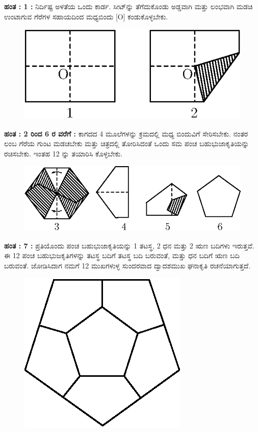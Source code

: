 \begin{enumerate}
 \noindent
 {\bf ಹಂತ : 1 :} ನಿರ್ದಿಷ್ಟ ಅಳತೆಯ ಒಂದು ಕಾರ್ಡ. ಸೀಟ್‌ನ್ನು ತೆಗೆದುಕೊಂಡು ಅಡ್ಡವಾಗಿ ಮತ್ತು ಲಂಭವಾಗಿ ಮಡಚಿ ಉಂಟಾಗುವ ಗೆರೆಗಳ ಸಹಾಯದಿಂದ ಮಧ್ಯಬಿಂದು  [O] ಕಂಡುಕೊಳ್ಳಬೇಕು. 
 \begin{figure}[H]
\centering
\includegraphics[scale=.98]{src/figure/chap1/fig1-21a.eps}
\end{figure}

 \noindent
 {\bf ಹಂತ : 2 ರಿಂದ 6 ರ ವರೆಗೆ :} ಕಾಗದದ 4 ಮೂಲೆಗಳನ್ನು ಕ್ರಮದಲ್ಲಿ ಮಧ್ಯ ಬಿಂದುವಿಗೆ ಸೇರಿಸಬೇಕು. ನಂತರ ಲಂಬ ಗೆರೆಯ ಗುಂಟ ಮಡಚಬೇಕು ಮತ್ತು ಚಿತ್ರದಲ್ಲಿ ತೋರಿಸಿದಂತೆ ಒಂದು ಸಮ ಪಂಚ ಬಹುಭುಜಾಕೃತಿಯನ್ನು ರಚಿಸಬೇಕು. ಇಂತಹ  12 ನ್ನು ತಯಾರಿಸಿ ಕೊಳ್ಳಬೇಕು. 
  \begin{figure}[H]
\centering
\includegraphics[scale=.98]{src/figure/chap1/fig1-21b.eps}
\end{figure}

 \noindent
 {\bf ಹಂತ : 7 :} ಪ್ರತಿಯೊಂದು ಪಂಚ ಬಹುಭುಜಾಕೃತಿಯನ್ನು 1 ತಟಸ್ಥ, 2 ಧನ ಮತ್ತು 2 ಋಣ ಬದಿಗಳು ಇರುತ್ತವೆ. ಈ 12 ಪಂಚ ಬಹುಭುಜಕೃತಿಗಳನ್ನು ತಟಸ್ಥ ಬದಿಗೆ ತಟಸ್ಥ ಬದಿ ಬರುವಂತೆ, ಮತ್ತು ಧನ ಬದಿಗೆ ಋಣ ಬದಿ ಬರುವಂತೆ. ಜೋಡಿಸಿದಾಗ ನಮಗೆ 12 ಮುಖಗಳುಳ್ಳ ಸುಂದರವಾದ ದ್ವಾದಶಮುಖ ಘನಾಕೃತಿ ರಚನೆಯಾಗುತ್ತದೆ. 
 \begin{figure}[H]
\centering
\includegraphics[scale=.98]{src/figure/chap1/fig1-21c.eps}
\end{figure}


\end{enumerate}
